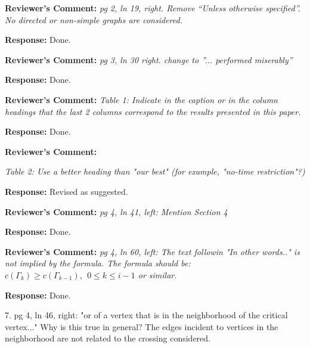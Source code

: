 \documentclass{article}
\newcommand{\rcomment}[1]{\vspace{0.3cm} \item \textbf{Reviewer's Comment:} {\em #1}}
\newcommand{\response}{\vspace{0.2cm} \textbf{Response: }}
\begin{document}
\begin{itemize}
\rcomment{pg 2, ln 19, right. Remove ``Unless otherwise specified''. No directed or non-simple graphs are considered.}

\response{Done.}

\rcomment{pg 3, ln 30 right. change to ''... performed miserably''}

\response{Done.}

\rcomment{Table 1: Indicate in the caption or in the column headings that the last 2 columns correspond to the results presented in this paper.}

\response{Done.}

\rcomment{Table 2: Use a better heading than "our best" (for example, "no-time restriction"?)

\response{Revised as suggested.}

\rcomment{pg 4, ln 41, left: Mention Section 4}

\response{Done.}

\rcomment{pg 4, ln 60, left: The text followin "In other words.." is not implied by the formula. The formula should be: $c(\Gamma_{k}) \geq c(\Gamma_{k-1}), ~~0 \leq k \leq i-1$ or similar.}

\response{Done.}

7. pg 4, ln 46, right: "or of a vertex that is in the neighborhood of the critical vertex..."
Why is this true in general? The edges incident to vertices in the neighborhood are not related
to the
crossing considered.

}
\end{itemize}
\end{document}
